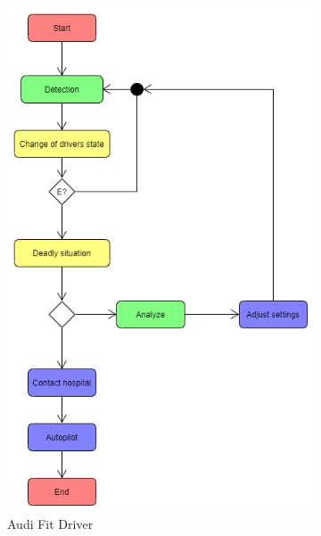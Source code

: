 \documentclass[10pt,oneside,slovak,a4paper]{article}
\begin{document}
\begin{figure} [H]

\begin{subfigure}{.5\textwidth}
  \includegraphics[width=1\linewidth]{EmergencyDiagram}
  \caption{Audi Fit Driver}
  \label{fig:sub1}
\end{subfigure}
\begin{subfigure}{.35\textwidth}

\end{subfigure}
\end{figure}
\end{document}

